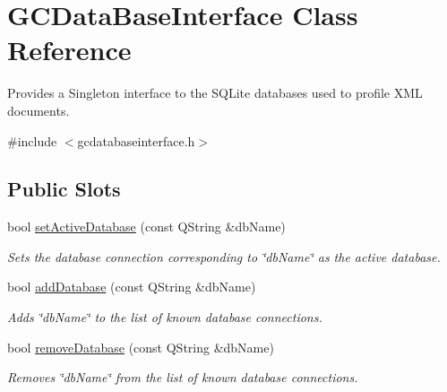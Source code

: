 \hypertarget{class_g_c_data_base_interface}{\section{\-G\-C\-Data\-Base\-Interface \-Class \-Reference}
\label{class_g_c_data_base_interface}
}


\-Provides a \-Singleton interface to the \-S\-Q\-Lite databases used to profile \-X\-M\-L documents.  




{\ttfamily \#include $<$gcdatabaseinterface.\-h$>$}

\subsection*{\-Public \-Slots}
\begin{DoxyCompactItemize}
\item 
bool \hyperlink{class_g_c_data_base_interface_a176952c9ba2fbc90809f9d64ea14a69f}{set\-Active\-Database} (const \-Q\-String \&db\-Name)
\begin{DoxyCompactList}\small\item\em \-Sets the database connection corresponding to \char`\"{}db\-Name\char`\"{} as the active database. \end{DoxyCompactList}\item 
bool \hyperlink{class_g_c_data_base_interface_a6b3cc67ba9e4bdf58b49869243446764}{add\-Database} (const \-Q\-String \&db\-Name)
\begin{DoxyCompactList}\small\item\em \-Adds \char`\"{}db\-Name\char`\"{} to the list of known database connections. \end{DoxyCompactList}\item 
bool \hyperlink{class_g_c_data_base_interface_a86dcb92e64a35e3fb72fa58a4bacc3b9}{remove\-Database} (const \-Q\-String \&db\-Name)
\begin{DoxyCompactList}\small\item\em \-Removes \char`\"{}db\-Name\char`\"{} from the list of known database connections. \end{DoxyCompactList}\end{DoxyCompactItemize}
